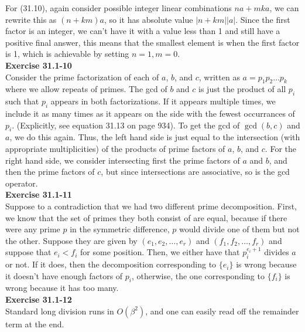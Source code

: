 \documentclass{article}
\begin{document}
For (31.10), again consider possible integer linear combinations $na + mka$, we can rewrite this as $(n+km)a$, so it has absolute value $|n+km||a|$. Since the first factor is an integer, we can't have it with a value less than 1 and still have a positive final answer, this means that the smallest element is when the first factor is 1, which is achievable by setting $n=1,m=0$.\\

\noindent\textbf{Exercise 31.1-10}\\

Consider the prime factorization of each of $a$, $b$, and $c$, written as $a = p_1p_2\ldots p_k$ where we allow repeats of primes.  The gcd of $b$ and $c$ is just the product of all $p_i$ such that $p_i$ appears in both factorizations.  If it appears multiple times, we include it as many times as it appears on the side with the fewest occurrances of $p_i$. (Explicitly, see equation 31.13 on page 934).  To get the gcd of $\gcd(b,c)$ and $a$, we do this again.  Thus, the left hand side is just equal to the intersection (with appropriate multiplicities) of the products of prime factors of $a$, $b$, and $c$.  For the right hand side, we consider intersecting first the prime factors of $a$ and $b$, and then the prime factors of $c$, but since intersections are associative, so is the gcd operator. \\

\noindent\textbf{Exercise 31.1-11}\\

Suppose to a contradiction that we had two different prime decomposition. First, we know that the set of primes they both consist of are equal, because if there were any prime $p$ in the symmetric difference, $p$ would divide one of them but not the other. Suppose they are given by $(e_1,e_2, \ldots,e_r)$ and $(f_1,f_2,\ldots,f_r)$ and suppose that $e_i < f_i$ for some position. Then, we either have that $p_i^{e_i+1}$ divides $a$ or not. If it does, then the decomposition corresponding to $\{e_i\}$ is wrong because it doesn't have enough factors of $p_i$, otherwise, the one corresponding to $\{f_i\}$ is wrong because it has too many.\\

\noindent\textbf{Exercise 31.1-12}\\

Standard long division runs in $O(\beta^2)$, and one can easily read off the remainder term at the end. \\
\end{document}
